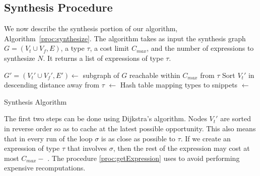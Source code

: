 \subsection{Synthesis Procedure}
\label{sec:algorithm:synthesis}
We now describe the synthesis portion of our algorithm, Algorithm~\ref{proc:synthesize}. The algorithm takes as input the synthesis graph $G=(V_t \cup V_f, E)$, a type $\tau$, a cost limit $C_{max}$, and the number of expressions to synthesize $N$. It returns a list of expressions of type $\tau$.
\begin{algorithm}[hbt]
\BlankLine
$G'=(V_t'\cup V_f', E') \longleftarrow$ subgraph of $G$ reachable within $C_{max}$ from $\tau$ \;
Sort $V_t'$ in descending distance away from $\tau$ \;
\Snips $\longleftarrow$ Hash table mapping types to snippets \;
\Exprs $\longleftarrow$ \Snips[$\tau$] \;
\caption{Synthesis Algorithm}\label{proc:synthesize}
\end{algorithm}
The first two steps can be done using Dijkstra's algorithm. Nodes $V_t'$ are sorted in reverse order so as
to cache at the latest possible opportunity. This also means that in every run of the loop 
$\sigma$ is as close as possible to $\tau$. If we
create an expression of type  $\tau$ that involves $\sigma$, then the rest of the expression may cost at most $C_{max} - $
\Dist{$\sigma$}. The procedure \ref{proc:getExpression} uses \Snips to
avoid performing expensive recomputations.

